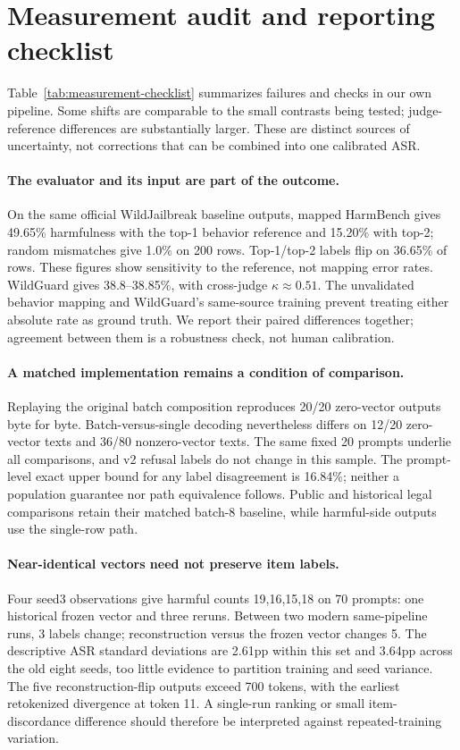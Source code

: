 \section{Measurement audit and reporting checklist}
\label{sec:pitfalls}
Table~\ref{tab:measurement-checklist} summarizes failures and checks in our own pipeline. Some shifts are comparable to the small contrasts being tested; judge-reference differences are substantially larger. These are distinct sources of uncertainty, not corrections that can be combined into one calibrated ASR.


\paragraph{The evaluator and its input are part of the outcome.} On the same official WildJailbreak baseline outputs, mapped HarmBench gives 49.65\% harmfulness with the top-1 behavior reference and 15.20\% with top-2; random mismatches give 1.0\% on 200 rows. Top-1/top-2 labels flip on 36.65\% of rows. These figures show sensitivity to the reference, not mapping error rates. WildGuard gives 38.8--38.85\%, with cross-judge $\kappa\approx0.51$. The unvalidated behavior mapping and WildGuard's same-source training prevent treating either absolute rate as ground truth. We report their paired differences together; agreement between them is a robustness check, not human calibration.

\paragraph{A matched implementation remains a condition of comparison.} Replaying the original batch composition reproduces 20/20 zero-vector outputs byte for byte. Batch-versus-single decoding nevertheless differs on 12/20 zero-vector texts and 36/80 nonzero-vector texts. The same fixed 20 prompts underlie all comparisons, and v2 refusal labels do not change in this sample. The prompt-level exact upper bound for any label disagreement is 16.84\%; neither a population guarantee nor path equivalence follows. Public and historical legal comparisons retain their matched batch-8 baseline, while harmful-side outputs use the single-row path.

\paragraph{Near-identical vectors need not preserve item labels.} Four seed3 observations give harmful counts 19,16,15,18 on 70 prompts: one historical frozen vector and three reruns. Between two modern same-pipeline runs, 3 labels change; reconstruction versus the frozen vector changes 5. The descriptive ASR standard deviations are 2.61pp within this set and 3.64pp across the old eight seeds, too little evidence to partition training and seed variance. The five reconstruction-flip outputs exceed 700 tokens, with the earliest retokenized divergence at token 11. A single-run ranking or small item-discordance difference should therefore be interpreted against repeated-training variation.

